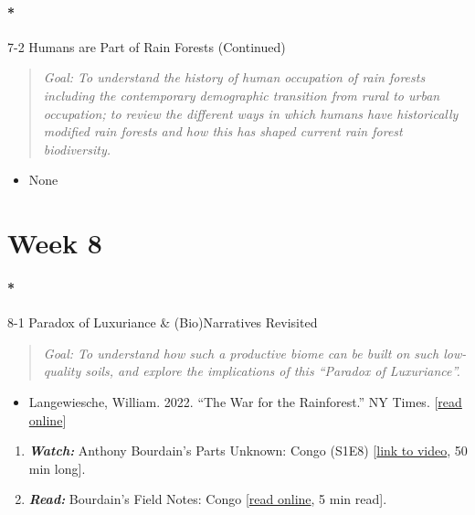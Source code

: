 \documentclass[
  10pt,
  letterpaper,
  oneside,
  open=any]{scrbook}
\let\oldparagraph\paragraph
\renewcommand{\paragraph}[1]{\oldparagraph{#1}\mbox{}}
\providecommand{\tightlist}{%
  \setlength{\itemsep}{0pt}\setlength{\parskip}{0pt}}\usepackage{longtable,booktabs,array}
\begin{document}
\paragraph*{7-2 Humans are Part of Rain Forests
(Continued)}\label{humans-are-part-of-rain-forests-continued}

\begin{quote}
\emph{Goal: To understand the history of human occupation of rain
forests including the contemporary demographic transition from rural to
urban occupation; to review the different ways in which humans have
historically modified rain forests and how this has shaped current rain
forest biodiversity.}
\end{quote}

\begin{itemize}
\tightlist
\item
  None
\end{itemize}

\section*{Week 8}\label{week-8}


\paragraph*{8-1 Paradox of Luxuriance \& (Bio)Narratives
Revisited}\label{paradox-of-luxuriance-bionarratives-revisited}

\begin{quote}
\emph{Goal: To understand how such a productive biome can be built on
such low-quality soils, and explore the implications of this ``Paradox
of Luxuriance''.}
\end{quote}

\begin{itemize}
\tightlist
\item
  Langewiesche, William. 2022. ``The War for the Rainforest.'' NY Times.
  {[}\href{https://www.nytimes.com/2022/03/16/magazine/amazon-rainforest-ituna-itata.html}{read
  online}{]}
\end{itemize}

\begin{enumerate}
\def\labelenumi{\arabic{enumi}.}
\item
  \textbf{\emph{Watch:}} Anthony Bourdain's Parts Unknown: Congo (S1E8)
  {[}\href{https://www.imdb.com/title/tt2849384/}{link to video}, 50 min
  long{]}.
\item
  \textbf{\emph{Read:}} Bourdain's Field Notes: Congo
  {[}\href{https://explorepartsunknown.com/congo/bourdains-field-notes-congo/}{read
  online}, 5 min read{]}.
\end{enumerate}
\end{document}
